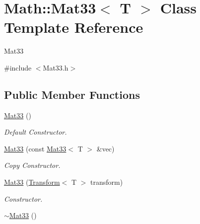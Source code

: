 \hypertarget{classMath_1_1Mat33}{
\section{Math::Mat33$<$ T $>$ Class Template Reference}
\label{classMath_1_1Mat33}
}


Mat33  


{\ttfamily \#include $<$Mat33.h$>$}\subsection*{Public Member Functions}
\begin{DoxyCompactItemize}
\item 
\hypertarget{classMath_1_1Mat33_ae8a008cecd9ba2bba8b09d6e3ce13ad3}{
\hyperlink{classMath_1_1Mat33_ae8a008cecd9ba2bba8b09d6e3ce13ad3}{Mat33} ()}
\label{classMath_1_1Mat33_ae8a008cecd9ba2bba8b09d6e3ce13ad3}

\begin{DoxyCompactList}\small\item\em Default Constructor. \item\end{DoxyCompactList}\item 
\hypertarget{classMath_1_1Mat33_a9e0800f4125aef34205806ee9b5ff78f}{
\hyperlink{classMath_1_1Mat33_a9e0800f4125aef34205806ee9b5ff78f}{Mat33} (const \hyperlink{classMath_1_1Mat33}{Mat33}$<$ T $>$ \&vec)}
\label{classMath_1_1Mat33_a9e0800f4125aef34205806ee9b5ff78f}

\begin{DoxyCompactList}\small\item\em Copy Constructor. \item\end{DoxyCompactList}\item 
\hypertarget{classMath_1_1Mat33_a76d5e08d6b090b0b608096a3631fd95d}{
\hyperlink{classMath_1_1Mat33_a76d5e08d6b090b0b608096a3631fd95d}{Mat33} (\hyperlink{classMath_1_1Transform}{Transform}$<$ T $>$ transform)}
\label{classMath_1_1Mat33_a76d5e08d6b090b0b608096a3631fd95d}

\begin{DoxyCompactList}\small\item\em Constructor. \item\end{DoxyCompactList}\item 
\hypertarget{classMath_1_1Mat33_a8ab48315883e9021628b5f0cdff99e97}{
\hyperlink{classMath_1_1Mat33_a8ab48315883e9021628b5f0cdff99e97}{$\sim$Mat33} ()}
\label{classMath_1_1Mat33_a8ab48315883e9021628b5f0cdff99e97}


\end{DoxyCompactItemize}
